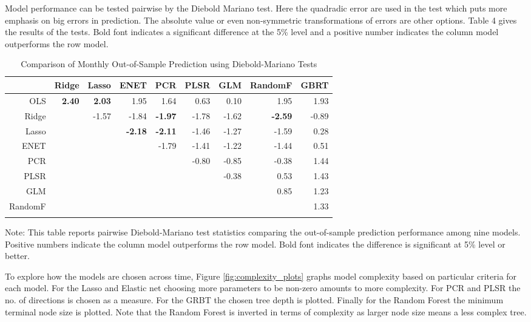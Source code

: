 \documentclass[]{article}
\begin{document}
Model performance can be tested pairwise by the Diebold Mariano test.
Here the quadradic error are used in the test which puts more emphasis
on big errors in prediction. The absolute value or even non-symmetric
transformations of errors are other options. Table 4 gives the results
of the tests. Bold font indicates a significant difference at the 5\%
level and a positive number indicates the column model outperforms the
row model.

\begin{table}[ht]
\begin{threeparttable}
\centering
\setlength{\tabcolsep}{5pt}
\caption{Comparison of Monthly Out-of-Sample Prediction using Diebold-Mariano Tests}
\centering
\begin{tabular}{r|rrrrrrrr}
  \Xhline{2\arrayrulewidth}
 & Ridge & Lasso & ENET & PCR & PLSR & GLM & RandomF & GBRT \\ 
  \hline
OLS & \textbf{2.40} & \textbf{2.03} & 1.95 & 1.64 & 0.63 & 0.10 & 1.95 & 1.93 \\ 
  Ridge && -1.57 & -1.84 & \textbf{-1.97} & -1.78 & -1.62 & \textbf{-2.59} & -0.89 \\ 
  Lasso &&& \textbf{-2.18} & \textbf{-2.11} & -1.46 & -1.27 & -1.59 & 0.28 \\ 
  ENET &&&& -1.79 & -1.41 & -1.22 & -1.44 & 0.51 \\ 
  PCR &&&&& -0.80 & -0.85 & -0.38 & 1.44 \\ 
  PLSR  &&&&&& -0.38 & 0.53 & 1.43 \\ 
  GLM  &&&&&&& 0.85 & 1.23 \\ 
  RandomF  &&&&&&&& 1.33 \\ 
   \Xhline{2\arrayrulewidth}
\end{tabular}
\begin{tablenotes}
      \small
      \item Note: This table reports pairwise Diebold-Mariano test statistics comparing the out-of-sample prediction performance among nine models. Positive numbers indicate the column model outperforms the row model. Bold font indicates the difference is significant at 5\% level or better.
    \end{tablenotes}
  \end{threeparttable}
\label{table:diebold}
\end{table}

To explore how the models are chosen across time, Figure
\ref{fig:complexity_plots} graphs model complexity based on particular
criteria for each model. For the Lasso and Elastic net choosing more
parameters to be non-zero amounts to more complexity. For PCR and PLSR
the no. of directions is chosen as a measure. For the GRBT the chosen
tree depth is plotted. Finally for the Random Forest the minimum
terminal node size is plotted. Note that the Random Forest is inverted
in terms of complexity as larger node size means a less complex tree.
\end{document}
